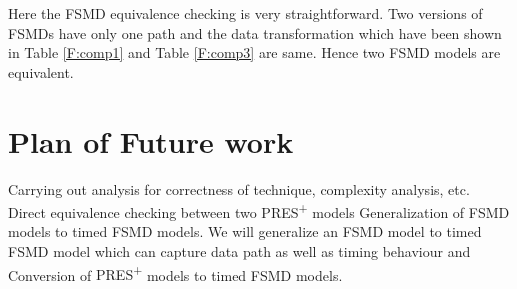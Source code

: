 \documentclass[9pt,executive]{article}
\def\presp{PRES\textsuperscript{+}}
\def\fsmd{FSMD}
\def\presp{PRES\textsuperscript{+}}
\def\fsmd{FSMD}
\begin{document}
Here the {\fsmd} equivalence checking is very straightforward. Two versions of {\fsmd}s have only one path and the data transformation 
which have been shown in Table \ref{F:comp1} and Table \ref{F:comp3} are same. Hence two {\fsmd} models are equivalent.

\section{Plan of Future work}\label{future-work}
 Carrying out analysis for correctness of technique, complexity analysis, etc. Direct equivalence checking between two {\presp} models
 Generalization of {\fsmd} models to timed {\fsmd} models.
 We will generalize an {\fsmd} model to timed {\fsmd} model which can capture data path as well as timing behaviour and
 Conversion of {\presp} models to timed {\fsmd} models.




































































\end{document}
